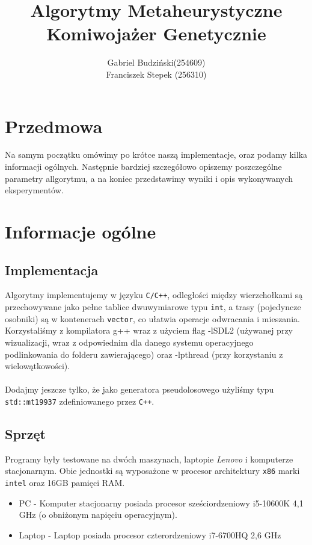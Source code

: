 \documentclass{article}
\title{\textbf{Algorytmy Metaheurystyczne\\Komiwojażer Genetycznie}}
\author{Gabriel Budziński(254609)\\Franciszek Stepek (256310)}
\date{}
\begin{document}
 
\maketitle

\section*{Przedmowa}
Na samym początku omówimy po krótce naszą implementacje, oraz podamy kilka informacji ogólnych. Następnie bardziej szczegółowo opiszemy poszczególne parametry allgorytmu, a na koniec przedstawimy wyniki i opis wykonywanych eksperymentów. 

\section{Informacje ogólne}
\subsection{Implementacja}
Algorytmy implementujemy w języku \texttt{C/C++}, odległości między wierzchołkami są przechowywane jako pełne tablice dwuwymiarowe typu \texttt{int}, a trasy (pojedyncze osobniki) są w kontenerach \texttt{vector}, co ułatwia operacje odwracania i mieszania.\\
Korzystaliśmy z kompilatora g++ wraz z użyciem flag -lSDL2 (używanej przy wizualizacji, wraz z odpowiednim dla danego systemu operacyjnego podlinkowania do folderu zawierającego) oraz -lpthread (przy korzystaniu z wielowątkowości).\\\\

Dodajmy jeszcze tylko, że jako generatora pseudolosowego użyliśmy typu \texttt{std::mt19937} zdefiniowanego przez \texttt{C++}.

\subsection{Sprzęt}
Programy były testowane na dwóch maszynach, laptopie \textit{Lenovo} i komputerze stacjonarnym. Obie jednostki są wyposażone w procesor architektury \texttt{x86} marki \texttt{intel} oraz 16GB pamięci RAM.
\begin{itemize}
	\item PC - Komputer stacjonarny posiada procesor sześciordzeniowy i5-10600K 4,1 GHz (o obniżonym napięciu operacyjnym).
	\item Laptop - Laptop posiada procesor czterordzeniowy i7-6700HQ 2,6 GHz
\end{itemize}
\end{document}
